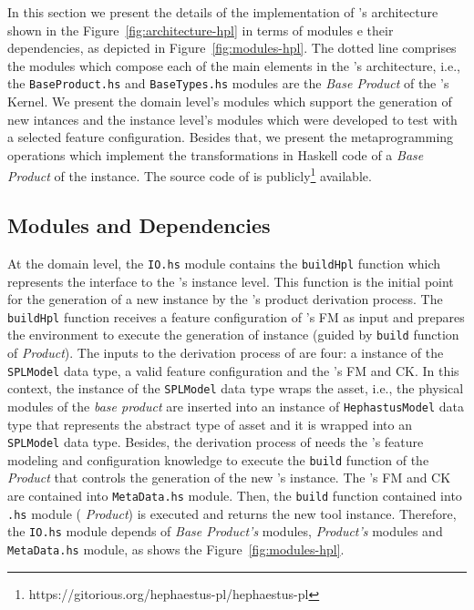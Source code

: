 In this section we present the details of the implementation of \hpl's architecture shown in the Figure~\ref{fig:architecture-hpl} in terms of modules e their dependencies, as depicted in Figure~\ref{fig:modules-hpl}.
The dotted line comprises the modules which compose each of the main elements in the \hpl's architecture, i.e., the \texttt{BaseProduct.hs} and \texttt{BaseTypes.hs} modules are the \textit{Base Product} of the \hpl's Kernel.
We present the domain level's modules which support the generation of new \hpl{} intances and the instance level's modules which were developed to test \hpl{} with a selected feature configuration. Besides that, we present the metaprogramming operations which implement the transformations in Haskell code of a \textit{Base Product} of the \hp{} instance.
The source code of \hpl{} is publicly\footnote{https://gitorious.org/hephaestus-pl/hephaestus-pl} available.


\subsection{Modules and Dependencies}

At the domain level, the \texttt{IO.hs} module contains the \texttt{buildHpl} function which represents the interface to the \hpl{}'s instance level. This function is the initial point for the generation of a new \hpl{} instance by the \hpl{}'s product derivation process.  
The \texttt{buildHpl} function receives a feature configuration of \hpl{}'s FM as input and prepares the environment to execute the generation of \hpl{} instance (guided by \texttt{build} function of \textit{\hp{} Product}). 
The inputs to the derivation process of \hpl{} are four: a instance of the \texttt{SPLModel} data type, a valid feature configuration and the \hpl's FM and CK.
In this context, the instance of the \texttt{SPLModel} data type wraps the \hp{} asset, i.e., the physical modules of the \textit{\hpl{} base product} are inserted into an instance of \texttt{HephastusModel} data type that represents the abstract type of \hp{} asset and it is wrapped into an \texttt{SPLModel} data type. 
Besides, the derivation process of \hpl{} needs the \hpl{}'s feature modeling and configuration knowledge
to execute the \texttt{build} function of the \textit{\hp{} Product} that controls the generation of the new \hpl's instance. 
The \hpl's FM and CK are contained into \texttt{MetaData.hs} module. Then, 
the \texttt{build} function contained into \texttt{\hp.hs} module (\textit{\hp{} Product}) is executed and returns the new \hpl{} tool instance. 
Therefore, the \texttt{IO.hs} module depends of \textit{Base Product's} modules, \textit{\hp{} Product's} modules and \texttt{MetaData.hs} module, as shows the Figure~\ref{fig:modules-hpl}.

